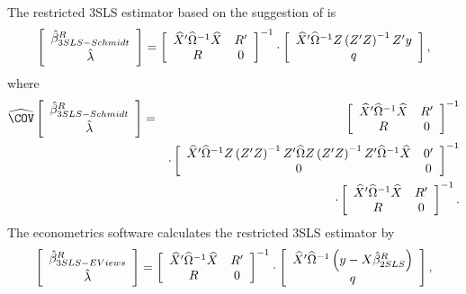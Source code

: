 The restricted 3SLS estimator based on the suggestion of
\cite{schmidt90} is
\begin{equation}
   \left[ \begin{array}{c}
      \hat{\beta}^R_{3SLS-Schmidt} \\[0.2em] \hat{\lambda}
   \end{array} \right]
   =
   \left[ \begin{array}{cc}
      \widehat{X}' \widehat{\Omega}^{-1} \widehat{X} & R' \\
      R & 0
   \end{array} \right]^{-1}
   \cdot
   \left[ \begin{array}{c}
      \widehat{X}' \widehat{\Omega}^{-1} Z \left( Z' Z \right)^{-1} Z' y \\ q
   \end{array} \right] ,
   \label{eq:3slsSchmidtR}
\end{equation}
where
\begin{eqnarray}
   \COVHat
   \left[ \begin{array}{c}
      \bHat^R_{3SLS-Schmidt} \\[0.2em] \lHat
   \end{array} \right] 
   & = & 
   \left[ \begin{array}{cc}
      \XHat' \OHat^{-1} \XHat & R' \\
      R & 0
   \end{array} \right]^{-1}
   \\
   & & \cdot
   \left[ \begin{array}{cc}
      \XHat' \OHat^{-1} Z \left( Z' Z \right)^{-1} Z' \OHat
      Z \left( Z' Z \right)^{-1} Z' \OHat^{-1} \XHat & 0' \\
      0 & 0
   \end{array} \right]^{-1}
   \nonumber \\
   & & \cdot
   \left[ \begin{array}{cc}
      \XHat' \OHat^{-1} \XHat & R' \\
      R & 0
   \end{array} \right]^{-1} .
   \nonumber
\end{eqnarray}
The econometrics software  calculates the restricted 3SLS estimator by
\begin{equation}
   \left[ \begin{array}{c}
      \hat{\beta}^R_{3SLS-EViews} \\[0.2em] \hat{\lambda}
   \end{array} \right]
   =
   \left[ \begin{array}{cc}
      \widehat{X}' \widehat{\Omega}^{-1} \widehat{X} & R' \\
      R & 0
   \end{array} \right]^{-1}
   \cdot
   \left[ \begin{array}{c}
      \widehat{X}' \widehat{\Omega}^{-1} \left( y - X \hat{\beta}^R_{2SLS} \right)
      \\ q 
   \end{array} \right] ,
   \label{eq:3slsEViewsR}
\end{equation}
